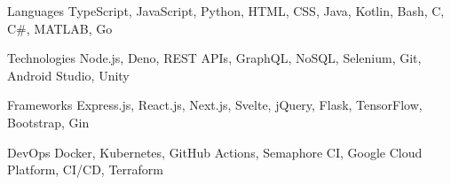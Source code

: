 

\begin{cvskills}

  \cvskill
    {Languages} %
    {TypeScript, JavaScript, Python, HTML, CSS, Java, Kotlin, Bash, C, C\#, MATLAB, Go } %

  \cvskill
    {Technologies} %
    {Node.js, Deno, REST APIs, GraphQL, NoSQL, Selenium, Git, Android Studio, Unity} %

  \cvskill
    {Frameworks} %
    {Express.js, React.js, Next.js, Svelte, jQuery, Flask, TensorFlow, Bootstrap, Gin} %

  \cvskill
    {DevOps} %
    {Docker, Kubernetes, GitHub Actions, Semaphore CI, Google Cloud Platform, CI/CD, Terraform} %

\end{cvskills}
